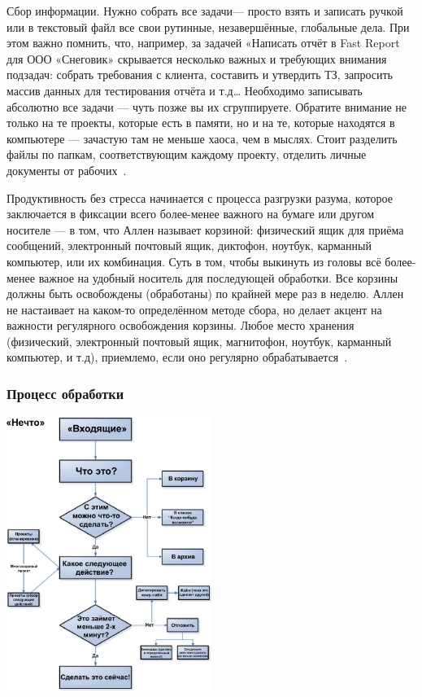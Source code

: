 \documentclass{../industrial-development}
\begin{document}
\lecturenotes

Сбор информации. Нужно собрать все задачи— просто взять и записать ручкой или в текстовый файл все свои рутинные, незавершённые, глобальные дела. При этом важно помнить, что, например, за задачей «Написать отчёт в Fast Report для ООО «Снеговик» скрывается несколько важных и требующих внимания подзадач: собрать требования с клиента, составить и утвердить ТЗ, запросить массив данных для тестирования отчёта и т.д… Необходимо записывать абсолютно все задачи — чуть позже вы их сгруппируете.
Обратите внимание не только на те проекты, которые есть в памяти, но и на те, которые находятся в компьютере — зачастую там не меньше хаоса, чем в мыслях. Стоит разделить файлы по папкам, соответствующим каждому проекту, отделить личные документы от рабочих~\cite{GTDHabr}. 

Продуктивность без стресса начинается с процесса разгрузки разума, которое заключается в фиксации всего более-менее важного на бумаге или другом носителе — в том, что Аллен называет корзиной: физический ящик для приёма сообщений, электронный почтовый ящик, диктофон, ноутбук, карманный компьютер, или их комбинация. Суть в том, чтобы выкинуть из головы всё более-менее важное на удобный носитель для последующей обработки. Все корзины должны быть освобождены (обработаны) по крайней мере раз в неделю. Аллен не настаивает на каком-то определённом методе сбора, но делает акцент на важности регулярного освобождения корзины. Любое место хранения (физический, электронный почтовый ящик, магнитофон, ноутбук, карманный компьютер, и т.д), приемлемо, если оно регулярно обрабатывается~\cite{GTDWikipedia}.

\begin{frame} \frametitle{Процесс обработки}
  \centerline{\includegraphics[width=0.5\textwidth]{ProcessingGTD.pdf}}
\end{frame}
\end{document}
